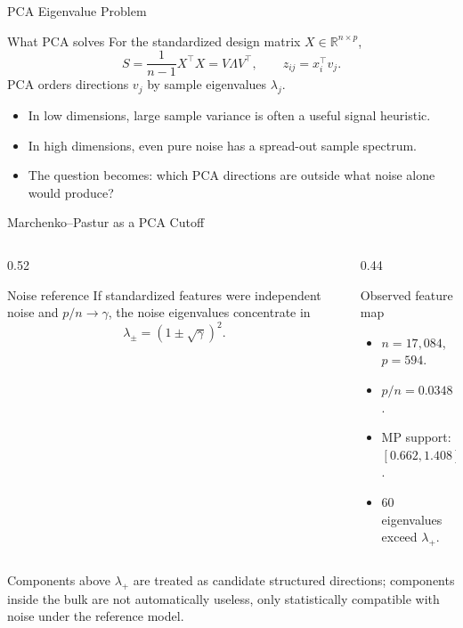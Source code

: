 \documentclass[english, xcolor=dvipsnames, aspectratio=169]{beamer}
\begin{document}
\begin{frame}{PCA Eigenvalue Problem}
\begin{block}{What PCA solves}
For the standardized design matrix \(X\in\mathbb{R}^{n\times p}\),
\[
S=\frac{1}{n-1}X^\top X = V\Lambda V^\top,
\qquad
z_{ij}=x_i^\top v_j.
\]
PCA orders directions \(v_j\) by sample eigenvalues \(\lambda_j\).
\end{block}
\begin{itemize}
\item In low dimensions, large sample variance is often a useful signal heuristic.
\item In high dimensions, even pure noise has a spread-out sample spectrum.
\item The question becomes: which PCA directions are outside what noise alone would produce?
\end{itemize}
\end{frame}

\begin{frame}{Marchenko--Pastur as a PCA Cutoff}
\begin{columns}[T,totalwidth=\textwidth]
\begin{column}{0.52\textwidth}
\begin{block}{Noise reference}
If standardized features were independent noise and \(p/n\to\gamma\), the noise eigenvalues concentrate in
\[
\lambda_{\pm}=(1\pm\sqrt{\gamma})^2.
\]
\end{block}
\end{column}
\begin{column}{0.44\textwidth}
\begin{block}{Observed feature map}
\begin{itemize}
\item \(n=17{,}084\), \(p=594\).
\item \(p/n=0.0348\).
\item MP support: \([0.662,1.408]\).
\item 60 eigenvalues exceed \(\lambda_+\).
\end{itemize}
\end{block}
\end{column}
\end{columns}
\vspace{0.15cm}
\small Components above \(\lambda_+\) are treated as candidate structured directions; components inside the bulk are not automatically useless, only statistically compatible with noise under the reference model.
\end{frame}
\end{document}
